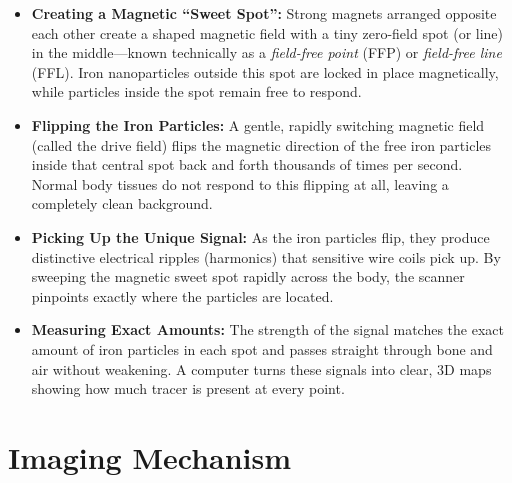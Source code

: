 \begin{itemize}
    \item \textbf{Creating a Magnetic ``Sweet Spot'':} Strong magnets arranged opposite each other create a shaped magnetic field with a tiny zero-field spot (or line) in the middle---known technically as a \textit{field-free point} (FFP) or \textit{field-free line} (FFL). Iron nanoparticles outside this spot are locked in place magnetically, while particles inside the spot remain free to respond.
    \item \textbf{Flipping the Iron Particles:} A gentle, rapidly switching magnetic field (called the drive field) flips the magnetic direction of the free iron particles inside that central spot back and forth thousands of times per second. Normal body tissues do not respond to this flipping at all, leaving a completely clean background.
    \item \textbf{Picking Up the Unique Signal:} As the iron particles flip, they produce distinctive electrical ripples (harmonics) that sensitive wire coils pick up. By sweeping the magnetic sweet spot rapidly across the body, the scanner pinpoints exactly where the particles are located.
    \item \textbf{Measuring Exact Amounts:} The strength of the signal matches the exact amount of iron particles in each spot and passes straight through bone and air without weakening. A computer turns these signals into clear, 3D maps showing how much tracer is present at every point.
\end{itemize}

\section{Imaging Mechanism}

